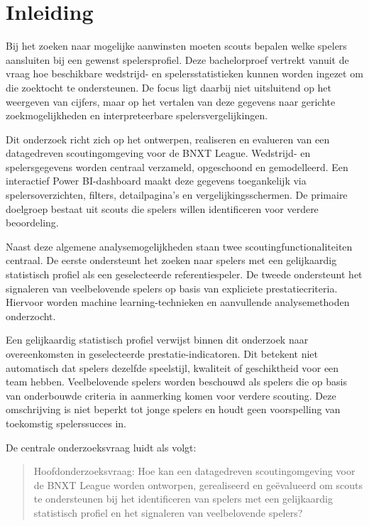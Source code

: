 
\section{Inleiding}%
\label{sec:inleiding}

Bij het zoeken naar mogelijke aanwinsten moeten scouts bepalen welke spelers aansluiten bij een gewenst spelersprofiel. Deze bachelorproef vertrekt vanuit de vraag hoe beschikbare wedstrijd- en spelersstatistieken kunnen worden ingezet om die zoektocht te ondersteunen. De focus ligt daarbij niet uitsluitend op het weergeven van cijfers, maar op het vertalen van deze gegevens naar gerichte zoekmogelijkheden en interpreteerbare spelersvergelijkingen.

Dit onderzoek richt zich op het ontwerpen, realiseren en evalueren van een datagedreven scoutingomgeving voor de BNXT League. Wedstrijd- en spelersgegevens worden centraal verzameld, opgeschoond en gemodelleerd. Een interactief Power BI-dashboard maakt deze gegevens toegankelijk via spelersoverzichten, filters, detailpagina's en vergelijkingsschermen. De primaire doelgroep bestaat uit scouts die spelers willen identificeren voor verdere beoordeling.

Naast deze algemene analysemogelijkheden staan twee scoutingfunctionaliteiten centraal. De eerste ondersteunt het zoeken naar spelers met een gelijkaardig statistisch profiel als een geselecteerde referentiespeler. De tweede ondersteunt het signaleren van veelbelovende spelers op basis van expliciete prestatiecriteria. Hiervoor worden machine learning-technieken en aanvullende analysemethoden onderzocht.

Een gelijkaardig statistisch profiel verwijst binnen dit onderzoek naar overeenkomsten in geselecteerde prestatie-indicatoren. Dit betekent niet automatisch dat spelers dezelfde speelstijl, kwaliteit of geschiktheid voor een team hebben. Veelbelovende spelers worden beschouwd als spelers die op basis van onderbouwde criteria in aanmerking komen voor verdere scouting. Deze omschrijving is niet beperkt tot jonge spelers en houdt geen voorspelling van toekomstig spelerssucces in.

De centrale onderzoeksvraag luidt als volgt:

\begin{quote}
Hoofdonderzoeksvraag: Hoe kan een datagedreven scoutingomgeving voor de BNXT League worden ontworpen, gerealiseerd en geëvalueerd om scouts te ondersteunen bij het identificeren van spelers met een gelijkaardig statistisch profiel en het signaleren van veelbelovende spelers?
\end{quote}

